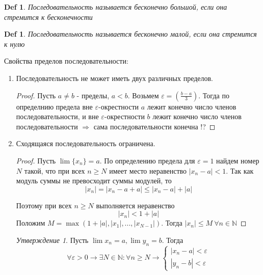 \documentclass[12pt]{article}
\newenvironment{MyList}[1][4pt]{
  \begin{enumerate}[1.]
  \setlength{\parskip}{0pt}
  \setlength{\itemsep}{#1}
}{       
  \end{enumerate}
}
\def\N{\mathbb{N}}       %
\theoremstyle{definition} %
\theoremstyle{plain} %
\newtheorem{Def}[Thm]{Def} %
\theoremstyle{remark} %
\newtheorem{Prop}[Thm]{Утверждение} %
\begin{document}
\begin{Def}
    Последовательность называется бесконечно большой, если она стремится к бесконечности 
\end{Def}

\begin{Def}
    Последовательность называется бесконечно малой, если она стремится к нулю
\end{Def}

Свойства пределов последовательности:
\begin{MyList}
    \item Последовательность не может иметь двух различных пределов.
    
    \begin{proof}
        Пусть $a \neq b$ - пределы, $a < b$. Возьмем $\varepsilon = \left(\frac{b - a}{3}\right)$. Тогда по определнию предела вне $\varepsilon$-окрестности $a$ лежит конечно число членов последовательности, и
        вне $\varepsilon$-окрестности $b$ лежит конечно число членов последовательности $\Rightarrow$ сама последовательности конечна !?    
    \end{proof}
    \item Сходящаяся последовательность ограничена.
    \begin{proof}
        Пусть $\lim \{x_n\} = a$. По определению предела для $\varepsilon = 1$ найдем номер $N$ такой, что при всех $n \geqslant N$ имеет место неравенство $|x_n - a| < 1$.
        Так как модуль суммы не превосходит суммы модулей, то 
        \[|x_n| = |x_n - a + a| \leqslant |x_n - a| + |a|\]

        Поэтому при всех $n \geqslant N$ выполняется неравенство
        \[|x_n| < 1 + |a|\]
        Положим $M = \max(1 + |a|, |x_1|, ..., |x_{N - 1}|)$. Тогда $|x_n| \leqslant M \ \forall n \in \N$   
    \end{proof}

    \begin{Prop}
        Пусть $\lim x_n = a, \lim y_n = b$. Тогда $$\forall \varepsilon > 0 \to \exists N \in \N : \forall n \geqslant N \to \begin{cases}
            |x_n - a| < \varepsilon \\
            |y_n - b| < \varepsilon
        \end{cases}$$


\end{Prop}
\end{MyList}
\end{document}
